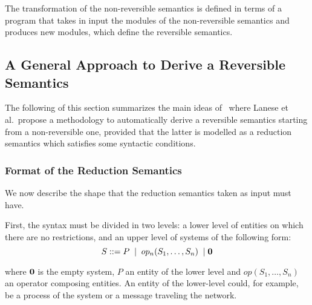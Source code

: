 \documentclass{article}[12pt,a4paper]
\theoremstyle{definition}
\newcommand{\paral}{\;|\;}
\begin{document}
The transformation of the non-reversible semantics is defined in terms of a
program that takes in input the modules of the non-reversible semantics and
produces new modules, which define the reversible semantics.


\subsection{A General Approach to Derive a Reversible Semantics}\label{sec:gener-appr-derive-rev-sem}


The following of this section summarizes the main ideas of~\cite{LaneseM20}
where Lanese et al.\ propose a methodology to automatically
derive a reversible semantics starting from a non-reversible one, provided that
the latter is modelled as a reduction semantics which satisfies some syntactic conditions.

\subsubsection{Format of the Reduction Semantics}

We now describe the shape that the reduction semantics taken as input
must have.

First, the syntax must be divided in two levels: a lower level of entities on which there are no restrictions, and an upper level of systems of the following
form:
\[
  S::=P\;\paral \;\op(S_1,\ldots,S_n)\; \paral \nil
\]

where ${\bf{0}}$ is the empty system, $P$ an entity of the lower level and $op(S_1,\ldots,S_n)$ an operator
composing entities. An entity of the lower-level could, for example, be a process of the system or
a message traveling the network.

\end{document}

